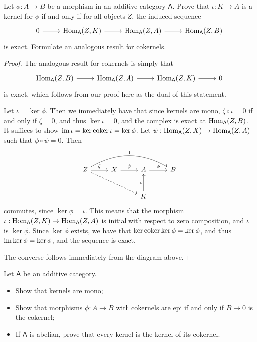 \documentclass[11pt]{report}
\begin{document}
\begin{exercise}
	Let $\phi : A \to B$ be a morphism in an additive category $\mathsf{A} $. Prove that $\iota : K \to A$ is a kernel for $\phi $ if and only if for all objects $Z$, the induced sequence
	\[\begin{tikzcd}[row sep = 2.5em, column sep = 2.5em]
		0\arrow[r]&\Hom_{\mathsf{A} }(Z, K) \arrow[r]&\Hom_{\mathsf{A} }(Z, A) \arrow[r]&\Hom_{\mathsf{A} }(Z, B) 
	\end{tikzcd}\]
	is exact. Formulate an analogous result for cokernels.
\end{exercise}
\begin{proof}
	The analogous result for cokernels is simply that
	\[\begin{tikzcd}[row sep = 2.5em, column sep = 2.5em]
		\Hom_{\mathsf{A} }(Z, B) \arrow[r]&\Hom_{\mathsf{A} }(Z, A) \arrow[r]&\Hom_{\mathsf{A} }(Z, K) \arrow[r]&0
	\end{tikzcd}\]
	is exact, which follows from our proof here as the dual of this statement.

	Let $\iota =\ker \phi $. Then we immediately have that since kernels are mono, $\zeta \circ \iota =0$ if and only if $\zeta =0$, and thus $\ker \iota =0$, and the complex is exact at $\operatorname{Hom}_{\mathsf{A} }(Z, B) $. It suffices to show $\operatorname{im} \iota =\ker \operatorname{coker} \iota =\ker \phi $. Let $\psi : \operatorname{Hom}_{\mathsf{A} }(Z, X)  \to \operatorname{Hom}_{\mathsf{A} }(Z, A) $ such that $\phi \circ \psi =0$. Then
	\[\begin{tikzcd}[row sep = 2.5em, column sep = 2.5em]
		Z\arrow[drr, dashed]\arrow[r, "\zeta "]\arrow[rrr, bend left, "0"]&X\arrow[r, "\psi "]&A\arrow[r, "\phi "]&B\\
							       &&K\arrow[u, "\iota "]
	\end{tikzcd}\]
	commutes, since $\ker \phi =\iota $. This means that the morphism $\iota : \operatorname{Hom}_{\mathsf{A} }(Z, K)  \to \operatorname{Hom}_{\mathsf{A} }(Z, A) $ is initial with respect to zero composition, and $\iota $ is $\ker \phi $. Since $\ker \phi $ exists, we have that $\ker \operatorname{coker} \ker \phi =\ker \phi $, and thus $\operatorname{im} \ker \phi =\ker \phi $, and the sequence is exact.

	The converse follows immediately from the diagram above.
\end{proof}
\begin{exercise}
	Let $\mathsf{A} $ be an additive category.
	\begin{itemize}
		\item Show that kernels are mono;
		\item Show that morphisms $\phi : A \to B$ with cokernels are epi if and only if $B\to 0$ is the cokernel;
		\item If $\mathsf{A} $ is abelian, prove that every kernel is the kernel of its cokernel.
	\end{itemize}
\end{exercise}
\end{document}
